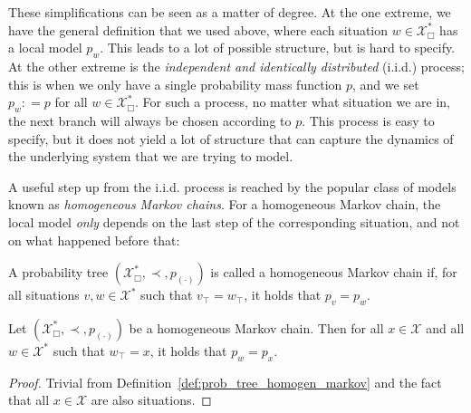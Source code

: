 \documentclass[graybox]{svmult}
\newcommand{\states}{\mathcal{X}}
\newcommand{\coloneqq}{:\!=}
\begin{document}
These simplifications can be seen as a matter of degree. At the one extreme, we have the general definition that we used above, where each situation $w\in\states^*_\Box$ has a local model $p_w$. This leads to a lot of possible structure, but is hard to specify. At the other extreme is the \emph{independent and identically distributed} (i.i.d.) process; this is when we only have a single probability mass function $p$, and we set $p_w\coloneqq p$ for all $w\in\states^*_\Box$. For such a process, no matter what situation we are in, the next branch will always be chosen according to $p$. This process is easy to specify, but it does not yield a lot of structure that can capture the dynamics of the underlying system that we are trying to model.

A useful step up from the i.i.d. process is reached by the popular class of models known as \emph{homogeneous Markov chains}. For a homogeneous Markov chain, the local model \emph{only} depends on the last step of the corresponding situation, and not on what happened before that:
\begin{definition}\label{def:prob_tree_homogen_markov}
A probability tree $(\states^*_\Box,\prec,p_{(\cdot)})$ is called a homogeneous Markov chain if, for all situations $v,w\in\states^*$ such that $v_\top=w_\top$, it holds that $p_v=p_w$.
\end{definition} 
\begin{corollary}
Let $(\states^*_\Box,\prec,p_{(\cdot)})$ be a homogeneous Markov chain. Then for all $x\in\states$ and all $w\in\states^*$ such that $w_\top=x$, it holds that $p_w=p_x$.
\end{corollary}
\begin{proof}
Trivial from Definition~\ref{def:prob_tree_homogen_markov} and the fact that all $x\in\states$ are also situations. 
\end{proof}
\end{document}
